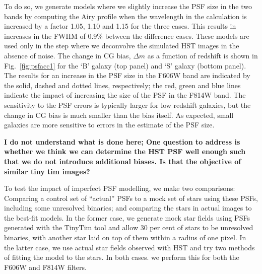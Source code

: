 \documentclass[useAMS,usenatbib]{mnras}
\begin{document}
To do so, we generate models where we slightly increase the PSF size in the two bands by computing the 
Airy profile when the wavelength in the calculation is increased by a factor 1.05, 1.10 and 1.15 for the three
cases. This results in increases in the FWHM of 0.9\% between the difference cases.  These models are used only in the step where we deconvolve the simulated HST images in the absence
of noise. The change in CG bias, $\Delta m$ as a function of redshift is shown in Fig.~\ref{fig:psfacc1}
for the `B' galaxy (top panel) and `S' galaxy (bottom panel).  The results for an increase in the PSF size in 
the F606W band are indicated by the solid, dashed and dotted lines, respectively; the red, green and blue 
lines indicate the impact of increasing the size of the PSF in the F814W band. The sensitivity to the PSF
errors is typically larger for low redshift galaxies, but the change in CG bias is much smaller than the bias
itself.  As expected, small galaxies are more sensitive to errors in the estimate of the PSF size.


{\bf I do not understand what is done here; One question to address is whether we think we can
determine the HST PSF well enough such that we do not introduce additional biases. Is that the
objective of similar tiny tim images?}


To test the impact of imperfect PSF modelling, we make two
comparisons: Comparing a control set of ``actual'' PSFs to a mock set
of stars using these PSFs, including some unresolved binaries; and
comparing the stars in actual images to the best-fit models. In the
former case, we generate mock star fields using PSFs generated with
the TinyTim tool \citep{2011SPIE.8127E..0JK} and allow 30 per cent of
stars to be unresolved binaries, with another star laid on top of them
within a radius of one pixel. In the latter case, we use actual star
fields observed with HST and try two methods of fitting the model to
the stars. In both cases. we perform this for both the F606W and F814W
filters.
\end{document}
